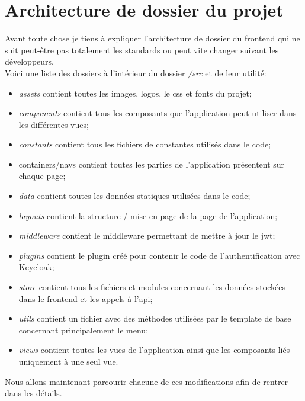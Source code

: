 \documentclass[
    iai, %
    il, %
]{heig-tb}
\begin{document}
\section{Architecture de dossier du projet}
Avant toute chose je tiens à expliquer l'architecture de dossier du \Gls{frontend} qui ne suit peut-être pas totalement les standards ou peut vite changer suivant les développeurs. \\
Voici une liste des dossiers à l'intérieur du dossier \emph{/src} et de leur utilité:
\begin{itemize}
    \item \emph{assets} contient toutes les images, logos, le css et fonts du projet;
    \item \emph{components} contient tous les composants que l'application peut utiliser dans les différentes vues;
    \item \emph{constants} contient tous les fichiers de constantes utilisés dans le code;
    \item containers/navs contient toutes les parties de l'application présentent sur chaque page;
    \item \emph{data} contient toutes les données statiques utilisées dans le code;
    \item \emph{layouts} contient la structure / mise en page de la page de l'application;
    \item \emph{middleware} contient le middleware permettant de mettre à jour le \Gls{jwt};
    \item \emph{plugins} contient le plugin créé pour contenir le code de l'authentification avec Keycloak;
    \item \emph{store} contient tous les fichiers et modules concernant les données stockées dans le \Gls{frontend} et les appels à l'\Gls{api};
    \item \emph{utils} contient un fichier avec des méthodes utilisées par le \Gls{template} de base concernant principalement le menu;
    \item \emph{views} contient toutes les vues de l'application ainsi que les composants liés uniquement à une seul vue.
\end{itemize}

Nous allons maintenant parcourir chacune de ces modifications afin de rentrer dans les détails.
\end{document}
